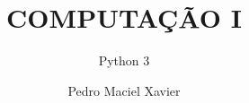 \documentclass[br, dark]{textbook}
\title{COMPUTAÇÃO I}
\author{Pedro Maciel Xavier}
\subtitle{Python 3}
\begin{document}
    \maketitlepage

    \frontmatter
    
    

    \mainmatter
    \tableofcontents
    

    \backmatter
    \appendix
    
    
\end{document}
